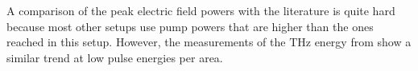 A comparison of the peak electric field powers with the literature is quite hard because most other setups use pump powers that are higher than the ones reached in this setup.
However, the measurements of the $\si{\tera\hertz}$ energy from \cite{THZ_eltric_field} show a similar trend at low pulse energies per area.
\\
\FloatBarrier
